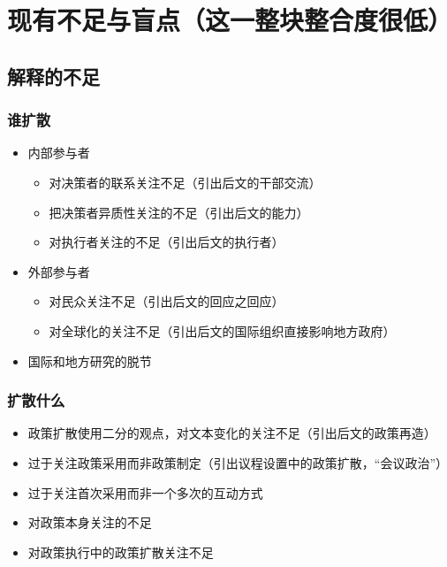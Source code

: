 \documentclass[
  12pt,
]{ctexart}
\begin{document}
\hypertarget{ux73b0ux6709ux4e0dux8db3ux4e0eux76f2ux70b9ux8fd9ux4e00ux6574ux5757ux6574ux5408ux5ea6ux5f88ux4f4e}{%
\section{现有不足与盲点（这一整块整合度很低）}\label{ux73b0ux6709ux4e0dux8db3ux4e0eux76f2ux70b9ux8fd9ux4e00ux6574ux5757ux6574ux5408ux5ea6ux5f88ux4f4e}}

\hypertarget{ux89e3ux91caux7684ux4e0dux8db3}{%
\subsection{解释的不足}\label{ux89e3ux91caux7684ux4e0dux8db3}}

\hypertarget{ux8c01ux6269ux6563}{%
\subsubsection{谁扩散}\label{ux8c01ux6269ux6563}}

\begin{itemize}
\item
  内部参与者

  \begin{itemize}
  \item
    对决策者的联系关注不足（引出后文的干部交流）
  \item
    把决策者异质性关注的不足（引出后文的能力）
  \item
    对执行者关注的不足（引出后文的执行者）
  \end{itemize}
\item
  外部参与者

  \begin{itemize}
  \item
    对民众关注不足（引出后文的回应之回应）
  \item
    对全球化的关注不足（引出后文的国际组织直接影响地方政府）
  \end{itemize}
\item
  国际和地方研究的脱节
\end{itemize}

\hypertarget{ux6269ux6563ux4ec0ux4e48}{%
\subsubsection{扩散什么}\label{ux6269ux6563ux4ec0ux4e48}}

\begin{itemize}
\item
  政策扩散使用二分的观点，对文本变化的关注不足（引出后文的政策再造）
\item
  过于关注政策采用而非政策制定（引出议程设置中的政策扩散，``会议政治''）
\item
  过于关注首次采用而非一个多次的互动方式
\item
  对政策本身关注的不足
\item
  对政策执行中的政策扩散关注不足
\end{itemize}
\end{document}
